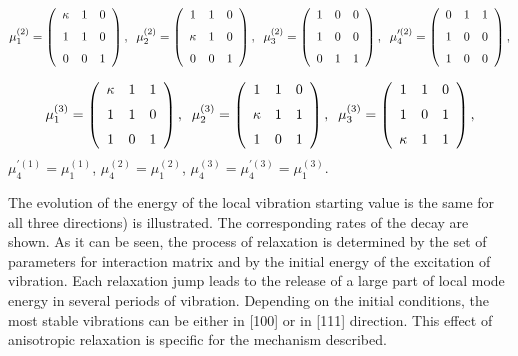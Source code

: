 \[ \mu_1^{(2)} = \left (\begin{array}{ccc}
\kappa&1&0\\\noalign{\medskip}1&1&0\\\noalign{
\medskip}0&0&1\end{array}
\right ),\;\;
\mu_2^{(2)} = \left (\begin{array}{ccc}
1&1&0\\\noalign{\medskip}\kappa&1&0\\\noalign{
\medskip}0&0&1\end{array}
\right ),\;\;
\mu_3^{(2)} = \left (\begin{array}{ccc}
1&0&0\\\noalign{\medskip}1&0&0\\\noalign{\medskip}
0&1&1\end {array}\right ),\;\;
\mu_4^{\prime (2)} = \left (\begin{array}{ccc}
0&1&1\\\noalign{\medskip}1&0&0\\\noalign{\medskip}
1&0&0\end{array}\right ), \]

\[ \mu_1^{(3)} = \left (\begin{array}{ccc}
\kappa&1&1\\\noalign{\medskip}1&1&0\\\noalign{
\medskip}1&0&1\end{array}
\right ),\;\;
\mu_2^{(3)} =  \left (\begin{array}{ccc}
1&1&0\\\noalign{\medskip}\kappa&1&1\\\noalign{\medskip}
1&0&1\end{array}\right ),\;\; 
\mu_3^{(3)} = \left (\begin{array}{ccc}
1&1&0\\\noalign{\medskip}1&0&1\\\noalign{\medskip}
\kappa&1&1\end{array}
\right ), \]
$\mu_4^{\prime (1)} = \mu_1^{(1)}$, $\mu_4^{(2)} = \mu_1^{(2)}$, 
$\mu_4^{(3)} = \mu_4^{\prime (3)} = \mu_1^{(3)}$.

The evolution of the energy of the local vibration 
starting value is the same for all three directions) is illustrated.
The corresponding rates of the decay are shown.
As it can be seen, the process of relaxation is determined by
the set of parameters for interaction matrix and by the initial energy of
the excitation of vibration. Each relaxation jump leads to the release 
of a large part of local
mode energy in several periods of vibration. Depending on the initial
conditions, the most stable
vibrations can be either in [100] or in [111] direction. This effect of
anisotropic relaxation is specific for the mechanism  described.

